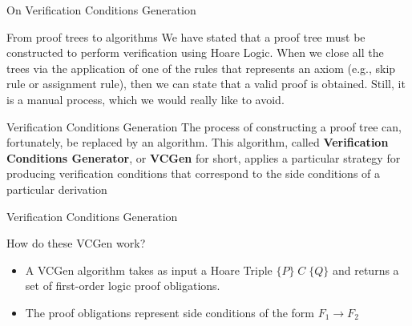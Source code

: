 \documentclass[aspectratio=169]{beamer}
\begin{document}

\begin{slide}{On Verification Conditions Generation}
\begin{block}{From proof trees to algorithms}
  We have stated that a proof tree must be constructed to perform verification using Hoare Logic. When we close all the trees via the application of one of the rules that represents an axiom (e.g., skip rule or assignment rule), then we can state that a valid proof is obtained. Still, it is a manual process, which we would really like to avoid.
\end{block}

\begin{block}{Verification Conditions Generation}
The process of constructing a proof tree can, fortunately, be replaced by an algorithm. This algorithm, called \textbf{Verification Conditions Generator}, or \textbf{VCGen} for short, applies a particular strategy for producing verification conditions that correspond to the side conditions of a particular derivation  
\end{block}

\end{slide}

\begin{slide}{Verification Conditions Generation}

\begin{block}{How do these VCGen work?}
\begin{itemize}
\item A VCGen algorithm takes as input a Hoare Triple $\{P\}\;C\;\{Q\}$ and returns a set of first-order logic proof obligations. 
\item The proof obligations represent side conditions of the form $F_1 \to F_2$ 
\end{itemize}
\end{block}
\end{slide}
\end{document}
